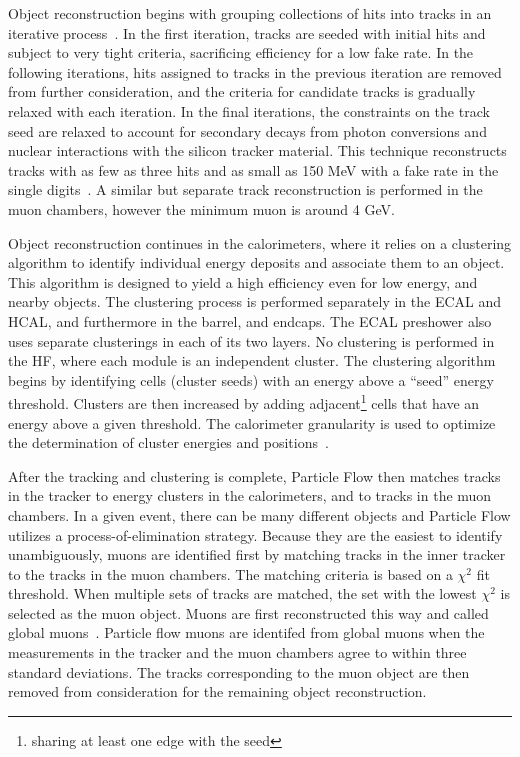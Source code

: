 Object reconstruction begins with grouping collections of hits into tracks in an iterative process~\cite{CMS-TRK-09-001}. In the first iteration, tracks are
seeded with initial hits and subject to very tight criteria, sacrificing efficiency for a low fake rate. In the following iterations, hits assigned to
tracks in the previous iteration are removed from further consideration, and the criteria for candidate tracks is gradually relaxed with each iteration. In the final iterations,
the constraints on the track seed are relaxed to account for secondary decays from photon conversions and nuclear interactions with the silicon tracker material. This technique
reconstructs tracks with as few as three hits and \pt as small as 150 MeV with a fake rate in the single digits~\cite{CMS-PFT-09-001}. A similar but separate track
reconstruction is performed in the muon chambers, however the minimum muon \pt is around 4 GeV. 

Object reconstruction continues in the calorimeters, where it relies on a clustering algorithm to identify individual energy deposits and associate them to an object. This
algorithm is designed to yield a high efficiency even for low energy, and nearby objects. The clustering process is performed separately in the ECAL and HCAL, and furthermore in
the barrel, and endcaps. The ECAL preshower also uses separate clusterings in each of its two layers. No clustering is performed in the HF, where each module is an
independent cluster. The clustering algorithm begins by identifying cells (cluster seeds) with an energy above a ``seed'' energy threshold. Clusters are then increased by
adding adjacent\footnote{sharing at least one edge with the seed} cells that have an energy above a given threshold. The calorimeter granularity is used to optimize the
determination of cluster energies and positions~\cite{CMS-PFT-09-001}.  

After the tracking and clustering is complete, Particle Flow then matches tracks in the tracker to energy clusters in the calorimeters, and to tracks in the muon chambers.
In a given event, there can be many different objects and Particle Flow utilizes
a process-of-elimination strategy. Because they are the easiest to identify unambiguously, muons are identified first by matching tracks in the inner tracker to the tracks in
the muon chambers. The matching criteria is based on a $\chi^{2}$ fit threshold. When multiple sets of tracks are matched, the set with the lowest $\chi^{2}$ is selected as the
muon object. Muons are first reconstructed this way and called global muons~\cite{globalmuon}. Particle flow muons are identifed from global muons when the \pt measurements
in the tracker and the muon chambers agree to within three standard deviations. The tracks corresponding to the muon object are then removed from consideration for the
remaining object reconstruction. 

